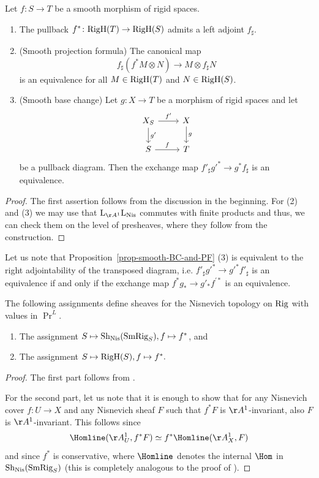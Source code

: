 \documentclass[colorinlistoftodos,article,11pt,reqno]{article}
\newcommand{\RigH}{\textup{RigH}}
\newcommand{\Rig}{\textup{Rig}}
\newcommand{\SmRig}{\textup{SmRig}}
\newcommand{\Sh}{\textup{Sh}}
\newcommand{\Nis}{\textup{Nis}}
\newcommand{\Arig}{\AA^{1}}
\renewcommand{\to}[1][]{\overset{#1}{\rightarrow}}
\renewcommand{\L}{\textup{L}}
\begin{document}
\begin{prop} \label{prop-smooth-BC-and-PF}
	Let $f\colon S\rightarrow T$ be a smooth morphism of rigid spaces.
	\begin{enumerate}
		\item The pullback $f^{*}\colon \RigH(T)\rightarrow \RigH(S)$ admits a left adjoint $f_{\sharp}$.
		\item (Smooth projection formula) The canonical map 
			\[ f_{\sharp}(f^{*}M\otimes N)\to M\otimes f_{\sharp}N \]
			is an equivalence for all $M\in\RigH(T)$ and $N\in\RigH(S)$.
		\item (Smooth base change) Let $g\colon X\rightarrow T$ be a morphism of rigid spaces and let 
		\[ \begin{tikzcd}
			X_{S}\arrow[r,"f'"]\arrow[d,"g'"]& X\arrow[d,"g"]\\
			S\arrow[r,"f"]&T
		\end{tikzcd} \]
		be a pullback diagram. Then the exchange map $f'_{\sharp}g'^{*}\to g^{*}f_{\sharp}$ is an equivalence.
	\end{enumerate}
\end{prop}
\begin{proof}
	The first assertion follows from the discussion in the beginning. For (2) and (3) we may use that $\L_{\Arig}\L_{\Nis}$ commutes with finite products and thus, we can check them on the level of presheaves, where they follow from the construction.
\end{proof}

\begin{rem}
    Let us note that Proposition~\ref{prop-smooth-BC-and-PF} (3) is equivalent to the right adjointability of the transposed diagram, i.e. $f'_{\sharp}g'^{*}\to g'^{*}f'_{\sharp}$ is an equivalence if and only if the exchange map $f^{*}g_{*}\to g'_{*} f^{'*}$ is an equivalence.
\end{rem}

\begin{prop} \label{prop-nisnevich-descent-RigH}
The following assignments define sheaves for the Nisnevich topology on $\Rig$ with values in $\Pr^{L}$.
\begin{enumerate}
	\item The assignment $S\mapsto\Sh_\Nis(\SmRig_S), f\mapsto f^*$, and
	\item The assignment $S\mapsto\RigH(S), f\mapsto f^*.$
\end{enumerate}
\end{prop}
\begin{proof}
The first part follows from \cite[Prop. 2.3.7]{AGV}.\par 
For the second part, let us note that it is enough to show that for any Nisnevich cover $f\colon U\to X$ and any Nisnevich sheaf $F$ such that $f^*F$ is $\Arig$-invariant, also $F$ is $\Arig$-invariant. This follows since 
\[ \Homline(\Arig_{U},f^*F) \simeq f^*\Homline(\Arig_X,F) \]
and since $f^*$ is conservative, where $\Homline$ denotes the internal $\Hom$ in $\Sh_\Nis(\SmRig_S)$ (this is completely analogous to the proof of \cite[Thm. 2.3.4]{AGV}).
\end{proof}
\end{document}
